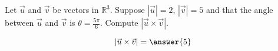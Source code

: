 \documentclass{ximera}
\author{Gregory Hartman \and Matthew Carr}
\begin{document}
\begin{exercise}



Let $\vec{u}$ and $\vec{v}$ be vectors in $\mathbb{R}^3$. Suppose $|\vec{u}|=2$, $|\vec{v}|=5$ and that the angle between $\vec{u}$ and $\vec{v}$ is $\theta=\frac{5\pi}{6}$. Compute $|\vec{u}\times\vec{v}|$.

\begin{prompt}
\[
|\vec{u}\times\vec{v}|=\answer{5}
\]
\end{prompt}


\end{exercise}
\end{document}
